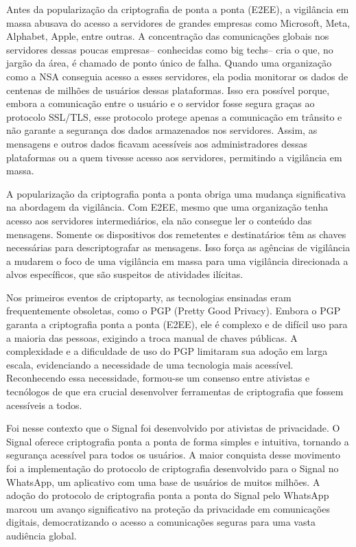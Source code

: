 Antes da popularização da criptografia de ponta a ponta (E2EE), a vigilância em massa abusava do acesso a servidores de grandes empresas como Microsoft, Meta, Alphabet, Apple, entre outras.
A concentração das comunicações globais nos servidores dessas poucas empresas-- conhecidas como big techs-- cria o que, no jargão da área, é chamado de ponto único de falha.
Quando uma organização como a NSA conseguia acesso a esses servidores, ela podia monitorar os dados de centenas de milhões de usuários dessas plataformas.
Isso era possível porque, embora a comunicação entre o usuário e o servidor fosse segura graças ao protocolo SSL/TLS, esse protocolo protege apenas a comunicação em trânsito e não garante a segurança dos dados armazenados nos servidores.
Assim, as mensagens e outros dados ficavam acessíveis aos administradores dessas plataformas ou a quem tivesse acesso aos servidores, permitindo a vigilância em massa.

A popularização da criptografia ponta a ponta obriga uma mudança significativa na abordagem da vigilância.
Com E2EE, mesmo que uma organização tenha acesso aos servidores intermediários, ela não consegue ler o conteúdo das mensagens.
Somente os dispositivos dos remetentes e destinatários têm as chaves necessárias para descriptografar as mensagens.
Isso força as agências de vigilância a mudarem o foco de uma vigilância em massa para uma vigilância direcionada a alvos específicos, que são suspeitos de atividades ilícitas.

Nos primeiros eventos de criptoparty, as tecnologias ensinadas eram frequentemente obsoletas, como o PGP (Pretty Good Privacy).
Embora o PGP garanta a criptografia ponta a ponta (E2EE), ele é complexo e de difícil uso para a maioria das pessoas, exigindo a troca manual de chaves públicas.
A complexidade e a dificuldade de uso do PGP limitaram sua adoção em larga escala, evidenciando a necessidade de uma tecnologia mais acessível.
Reconhecendo essa necessidade, formou-se um consenso entre ativistas e tecnólogos de que era crucial desenvolver ferramentas de criptografia que fossem acessíveis a todos.

Foi nesse contexto que o Signal foi desenvolvido por ativistas de privacidade.
O Signal oferece criptografia ponta a ponta de forma simples e intuitiva, tornando a segurança acessível para todos os usuários.
A maior conquista desse movimento foi a implementação do protocolo de criptografia desenvolvido para o Signal no WhatsApp, um aplicativo com uma base de usuários de muitos milhões.
A adoção do protocolo de criptografia ponta a ponta do Signal pelo WhatsApp marcou um avanço significativo na proteção da privacidade em comunicações digitais, democratizando o acesso a comunicações seguras para uma vasta audiência global.

